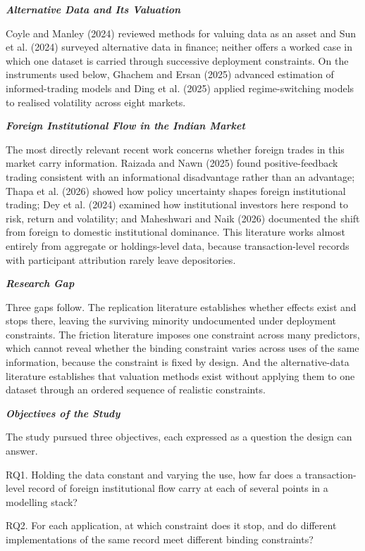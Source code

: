 \documentclass[12pt,a4paper]{article}
\newcommand{\subhead}[1]{%
  \par\vspace{6pt}\noindent\textbf{\textit{#1}}\par\vspace{1pt}}
\begin{document}
\subhead{Alternative Data and Its Valuation}

Coyle and Manley (2024) reviewed methods for valuing data as an asset and Sun et al. (2024) surveyed alternative data in finance; neither offers a worked case in which one dataset is carried through successive deployment constraints. On the instruments used below, Ghachem and Ersan (2025) advanced estimation of informed-trading models and Ding et al. (2025) applied regime-switching models to realised volatility across eight markets.

\subhead{Foreign Institutional Flow in the Indian Market}

The most directly relevant recent work concerns whether foreign trades in this market carry information. Raizada and Nawn (2025) found positive-feedback trading consistent with an informational disadvantage rather than an advantage; Thapa et al. (2026) showed how policy uncertainty shapes foreign institutional trading; Dey et al. (2024) examined how institutional investors here respond to risk, return and volatility; and Maheshwari and Naik (2026) documented the shift from foreign to domestic institutional dominance. This literature works almost entirely from aggregate or holdings-level data, because transaction-level records with participant attribution rarely leave depositories.

\subhead{Research Gap}

Three gaps follow. The replication literature establishes whether effects exist and stops there, leaving the surviving minority undocumented under deployment constraints. The friction literature imposes one constraint across many predictors, which cannot reveal whether the binding constraint varies across uses of the same information, because the constraint is fixed by design. And the alternative-data literature establishes that valuation methods exist without applying them to one dataset through an ordered sequence of realistic constraints.

\subhead{Objectives of the Study}

The study pursued three objectives, each expressed as a question the design can answer.

RQ1. Holding the data constant and varying the use, how far does a transaction-level record of foreign institutional flow carry at each of several points in a modelling stack?

RQ2. For each application, at which constraint does it stop, and do different implementations of the same record meet different binding constraints?
\end{document}
